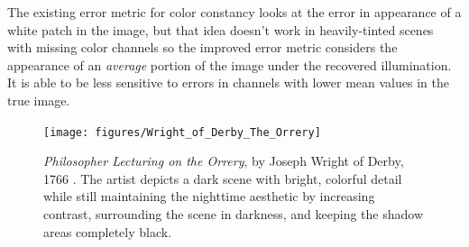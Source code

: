 \documentclass{sig-alternate}
\begin{document}
The existing error metric for color constancy looks at the error in appearance of a white patch in the image, but that idea doesn't work in heavily-tinted scenes with missing color channels so the improved error metric considers the appearance of an \emph{average} portion of the image under the recovered illumination. It is able to be less sensitive to errors in channels with lower mean values in the true image.~\cite{Liba2019}

\begin{figure}
\centering
\texttt{[image: figures/Wright\_of\_Derby\_The\_Orrery]}
\caption{ \emph{Philosopher Lecturing on the Orrery}, by Joseph Wright of Derby, 1766 \cite{file:theOrrery}. The artist depicts a dark scene with bright, colorful detail while still maintaining the nighttime aesthetic by increasing contrast, surrounding the scene in darkness, and keeping the shadow areas completely black.~\cite{blog:Wronski2018}}
\label{fig:theOrrery}
\end{figure}
\end{document}
